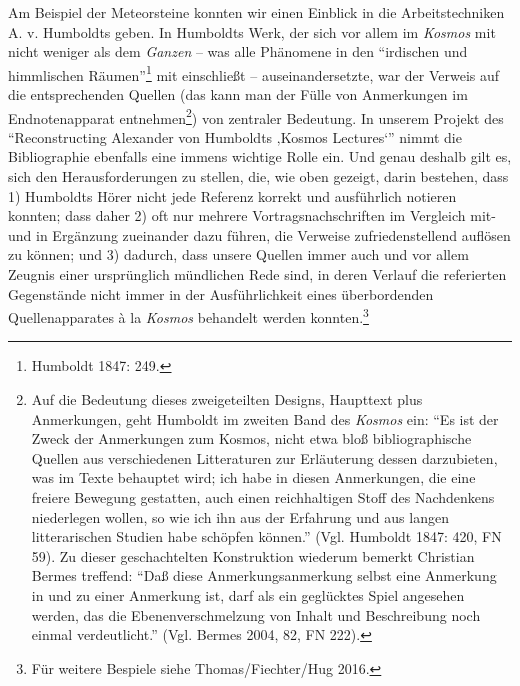 Am Beispiel der Meteorsteine konnten wir einen Einblick in die
Arbeitstechniken A. v. Humboldts geben. In Humboldts Werk, der sich vor
allem im \emph{Kosmos} mit nicht weniger als dem \emph{Ganzen} -- was
alle Phänomene in den \enquote{irdischen und himmlischen
Räumen}\footnote{Humboldt 1847: 249.} mit einschließt --
auseinandersetzte, war der Verweis auf die entsprechenden Quellen (das
kann man der Fülle von Anmerkungen im Endnotenapparat
entnehmen\footnote{Auf die Bedeutung dieses zweigeteilten Designs,
  Haupttext plus Anmerkungen, geht Humboldt im zweiten Band des
  \emph{Kosmos} ein: \enquote{Es ist der Zweck der Anmerkungen zum
  Kosmos, nicht etwa bloß bibliographische Quellen aus verschiedenen
  Litteraturen zur Erläuterung dessen darzubieten, was im Texte
  behauptet wird; ich habe in diesen Anmerkungen, die eine freiere
  Bewegung gestatten, auch einen reichhaltigen Stoff des Nachdenkens
  niederlegen wollen, so wie ich ihn aus der Erfahrung und aus langen
  litterarischen Studien habe schöpfen können.} (Vgl. Humboldt 1847:
  420, FN 59). Zu dieser geschachtelten Konstruktion wiederum bemerkt
  Christian Bermes treffend: \enquote{Daß diese Anmerkungsanmerkung
  selbst eine Anmerkung in und zu einer Anmerkung ist, darf als ein
  geglücktes Spiel angesehen werden, das die Ebenenverschmelzung von
  Inhalt und Beschreibung noch einmal verdeutlicht.} (Vgl. Bermes 2004,
  82, FN 222).}) von zentraler Bedeutung. In unserem Projekt des
\enquote{Reconstructing Alexander von Humboldts ‚Kosmos Lectures`} nimmt
die Bibliographie ebenfalls eine immens wichtige Rolle ein. Und genau
deshalb gilt es, sich den Herausforderungen zu stellen, die, wie oben
gezeigt, darin bestehen, dass 1) Humboldts Hörer nicht jede Referenz
korrekt und ausführlich notieren konnten; dass daher 2) oft nur mehrere
Vortragsnachschriften im Vergleich mit- und in Ergänzung zueinander dazu
führen, die Verweise zufriedenstellend auflösen zu können; und 3)
dadurch, dass unsere Quellen immer auch und vor allem Zeugnis einer
ursprünglich mündlichen Rede sind, in deren Verlauf die referierten
Gegenstände nicht immer in der Ausführlichkeit eines überbordenden
Quellenapparates à la \emph{Kosmos} behandelt werden konnten.\footnote{Für
  weitere Bespiele siehe Thomas/Fiechter/Hug 2016.}

